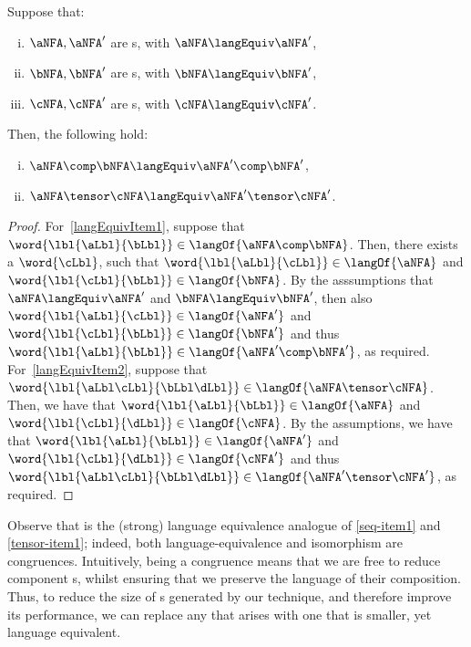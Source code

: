 \begin{theorem}\label{thm:langEquivCongruence}

    Suppose that:
    \begin{enumerate}[(i)]
        \item $\aNFA, \aNFA'$ are \NFAB{\aN}{\bN}s, with $\aNFA \langEquiv \aNFA'$,
        \item $\bNFA, \bNFA'$ are \NFAB{\bN}{\cN}s, with $\bNFA \langEquiv \bNFA'$,
        \item $\cNFA, \cNFA'$ are \NFAB{\cN}{\dN}s, with $\cNFA \langEquiv \cNFA'$.
    \end{enumerate}
    Then, the following hold:
\begin{enumerate}[(i)]
    \item \label{langEquivItem1} $\aNFA \comp \bNFA \langEquiv \aNFA' \comp \bNFA'$,
    \item \label{langEquivItem2} $\aNFA \tensor \cNFA \langEquiv \aNFA' \tensor \cNFA'$.
\end{enumerate}
\end{theorem}
\begin{proof}
    For~\ref{langEquivItem1}, suppose that $\word{\lbl{\aLbl}{\bLbl}} \in
    \langOf{\aNFA \comp \bNFA}$. Then, there exists a $\word{\cLbl}$, such that
    $\word{\lbl{\aLbl}{\cLbl}} \in \langOf{\aNFA}$ and
    $\word{\lbl{\cLbl}{\bLbl}} \in \langOf{\bNFA}$. By the asssumptions that
    $\aNFA \langEquiv \aNFA'$ and $\bNFA \langEquiv \bNFA'$, then also
    $\word{\lbl{\aLbl}{\cLbl}} \in \langOf{\aNFA'}$ and
    $\word{\lbl{\cLbl}{\bLbl}} \in \langOf{\bNFA'}$ and thus
    $\word{\lbl{\aLbl}{\bLbl}} \in \langOf{\aNFA' \comp \bNFA'}$, as required.
    For~\ref{langEquivItem2}, suppose that $\word{\lbl{\aLbl\cLbl}{\bLbl\dLbl}}
    \in \langOf{\aNFA \tensor \cNFA}$. Then, we have that
    $\word{\lbl{\aLbl}{\bLbl}} \in \langOf{\aNFA}$ and
    $\word{\lbl{\cLbl}{\dLbl}} \in \langOf{\cNFA}$. By the assumptions, we have
    that $\word{\lbl{\aLbl}{\bLbl}} \in \langOf{\aNFA'}$ and
    $\word{\lbl{\cLbl}{\dLbl}} \in \langOf{\cNFA'}$ and thus
    $\word{\lbl{\aLbl\cLbl}{\bLbl\dLbl}} \in \langOf{\aNFA' \tensor \cNFA'}$,
    as required.
\end{proof}

Observe that  is the (strong) language
equivalence analogue of \ref{seq-item1} and
\ref{tensor-item1}; indeed, both
language-equivalence and isomorphism are congruences. Intuitively, being a
congruence means that we are free to reduce component \TNFA{}s, whilst ensuring
that we preserve the language of their composition. Thus, to reduce the size of
\TNFA{}s generated by our technique, and therefore improve its performance, we
can replace any \TNFA{} that arises with one that is smaller, yet language
equivalent.

